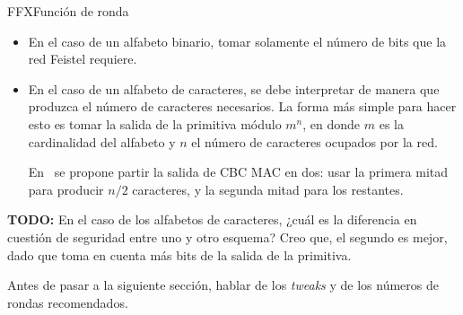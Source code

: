 \begin{frame}{FFX}{Función de ronda}
{\begin{itemize}
      \item En el caso de un alfabeto binario, tomar solamente el número
        de bits que la red Feistel requiere.

      \item En el caso de un alfabeto de caracteres, se debe interpretar de
        manera que produzca el número de caracteres necesarios. La forma más
        simple para hacer esto es tomar la salida de la primitiva módulo
        $ m^n $, en donde $ m $ es la cardinalidad del alfabeto y $ n $ el
        número de caracteres ocupados por la red.

        En~\cite{ffx_2} se propone partir la salida de CBC MAC en dos: usar
        la primera mitad para producir $ n/2 $ caracteres, y la segunda
        mitad para los restantes.

    \end{itemize}
  }

  {
    \textbf{TODO:} En el caso de los alfabetos de caracteres, ¿cuál es la
    diferencia en cuestión de seguridad entre uno y otro esquema? Creo que,
    el segundo es mejor, dado que toma en cuenta más bits de la salida de
    la primitiva.

    Antes de pasar a la siguiente sección, hablar de los \textit{tweaks} y
    de los números de rondas recomendados.
  }

\end{frame}
